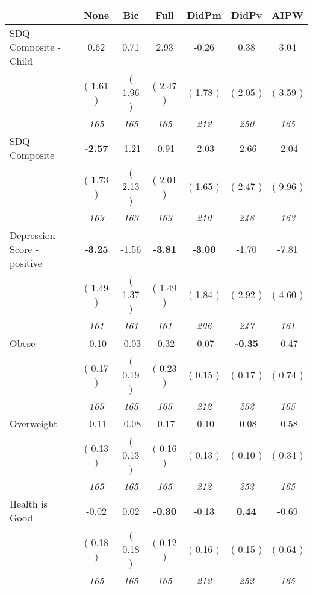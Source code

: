 \begin{tabular}{l c c c c c c}
\toprule
 & None & Bic & Full & DidPm & DidPv & AIPW \\
\midrule
SDQ Composite - Child &      0.62 &      0.71 &      2.93 &     -0.26 &      0.38 &      3.04 \\
& (     1.61 ) & (     1.96 ) & (     2.47 ) & (     1.78 ) & (     2.05 ) & (     3.59 ) \\
& \textit{ 165 } & \textit{ 165 } & \textit{ 165 } & \textit{ 212 } & \textit{ 250 } & \textit{ 165 } \\
SDQ Composite & \textbf{     -2.57 } &     -1.21 &     -0.91 &     -2.03 &     -2.66 &     -2.04 \\
& (     1.73 ) & (     2.13 ) & (     2.01 ) & (     1.65 ) & (     2.47 ) & (     9.96 ) \\
& \textit{ 163 } & \textit{ 163 } & \textit{ 163 } & \textit{ 210 } & \textit{ 248 } & \textit{ 163 } \\
Depression Score - positive & \textbf{     -3.25 } &     -1.56 & \textbf{     -3.81 } & \textbf{     -3.00 } &     -1.70 &     -7.81 \\
& (     1.49 ) & (     1.37 ) & (     1.49 ) & (     1.84 ) & (     2.92 ) & (     4.60 ) \\
& \textit{ 161 } & \textit{ 161 } & \textit{ 161 } & \textit{ 206 } & \textit{ 247 } & \textit{ 161 } \\
Obese &     -0.10 &     -0.03 &     -0.32 &     -0.07 & \textbf{     -0.35 } &     -0.47 \\
& (     0.17 ) & (     0.19 ) & (     0.23 ) & (     0.15 ) & (     0.17 ) & (     0.74 ) \\
& \textit{ 165 } & \textit{ 165 } & \textit{ 165 } & \textit{ 212 } & \textit{ 252 } & \textit{ 165 } \\
Overweight &     -0.11 &     -0.08 &     -0.17 &     -0.10 &     -0.08 &     -0.58 \\
& (     0.13 ) & (     0.13 ) & (     0.16 ) & (     0.13 ) & (     0.10 ) & (     0.34 ) \\
& \textit{ 165 } & \textit{ 165 } & \textit{ 165 } & \textit{ 212 } & \textit{ 252 } & \textit{ 165 } \\
Health is Good &     -0.02 &      0.02 & \textbf{     -0.30 } &     -0.13 & \textbf{      0.44 } &     -0.69 \\
& (     0.18 ) & (     0.18 ) & (     0.12 ) & (     0.16 ) & (     0.15 ) & (     0.64 ) \\
& \textit{ 165 } & \textit{ 165 } & \textit{ 165 } & \textit{ 212 } & \textit{ 252 } & \textit{ 165 } \\

\end{tabular}
